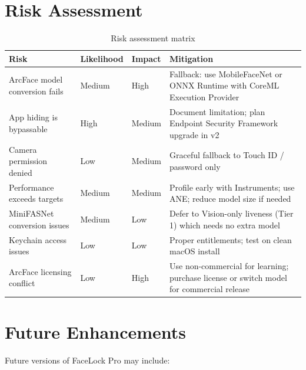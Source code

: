 \documentclass[12pt,a4paper]{report}
\begin{document}
\chapter{Risk Assessment}

\begin{table}[H]
\centering
\begin{tabularx}{\textwidth}{lllX}
\toprule
\textbf{Risk} & \textbf{Likelihood} & \textbf{Impact} & \textbf{Mitigation} \\
\midrule
ArcFace model conversion fails & Medium & High & Fallback: use MobileFaceNet or ONNX Runtime with CoreML Execution Provider \\
App hiding is bypassable & High & Medium & Document limitation; plan Endpoint Security Framework upgrade in v2 \\
Camera permission denied & Low & Medium & Graceful fallback to Touch ID / password only \\
Performance exceeds targets & Medium & Medium & Profile early with Instruments; use ANE; reduce model size if needed \\
MiniFASNet conversion issues & Medium & Low & Defer to Vision-only liveness (Tier 1) which needs no extra model \\
Keychain access issues & Low & Low & Proper entitlements; test on clean macOS install \\
ArcFace licensing conflict & Low & High & Use non-commercial for learning; purchase license or switch model for commercial release \\
\bottomrule
\end{tabularx}
\caption{Risk assessment matrix}
\end{table}

\chapter{Future Enhancements}

Future versions of FaceLock Pro may include:
\end{document}
